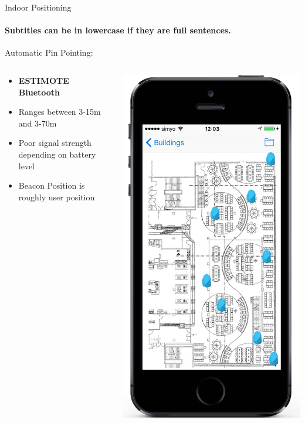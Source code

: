 \documentclass[11pt]{beamer}
\begin{document}
\begin{frame}{Indoor Positioning}

\framesubtitle{Subtitles can be in lowercase if they are full sentences.}
Automatic Pin Pointing:

  \begin{columns}[T]
  \begin{column}{.6\textwidth}
  \begin{itemize}
  \item  \textbf{ESTIMOTE Bluetooth} \\
  \item Ranges between 3-15m and 3-70m
  \item Poor signal strength depending on battery level
  \item Beacon Position is roughly user position
  \end{itemize}
  \end{column}
  \begin{column}{.4\textwidth}
  \includegraphics[scale=0.25]{beaconsonthemap}

\end{column}
\end{columns}
\end{frame}
\end{document}
